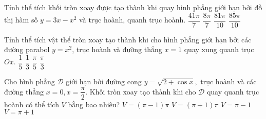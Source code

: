 \begin{ex}%
Tính thể tích khối tròn xoay được tạo thành khi quay hình phẳng giới hạn bởi đồ thị hàm số $y=3x-x^2$ và trục hoành, quanh trục hoành.
\choice
{$\dfrac{41\pi}{7}$}
{$\dfrac{8\pi}{7}$}
{\True $\dfrac{81\pi}{10}$}
{$\dfrac{85\pi}{10}$}
\end{ex}

 
 

 
 


 

\begin{ex}%
Tính thể tích vật thể tròn xoay tạo thành khi cho hình phẳng giới hạn bởi các đường parabol $y=x^2$, trục hoành và đường thẳng $x=1$ quay xung quanh trục $Ox$.
\choice
{$\dfrac{1}{5}$}
{$\dfrac{1}{3}$}
{\True $\dfrac{\pi}{5}$}
{$\dfrac{\pi}{3}$}
\end{ex}

\begin{ex}%
Cho hình phẳng $\mathscr{D}$ giới hạn bởi đường cong $y=\sqrt{2+\cos x},$ trục hoành và các đường thẳng $x=0,x=\dfrac{\pi}{2}$. Khối tròn xoay tạo thành khi cho $\mathscr{D}$ quay quanh trục hoành có thể tích $V$ bằng bao nhiêu?
\choice
{$V=(\pi-1)\pi $}
{\True $V=(\pi+1)\pi $}
{$V=\pi-1$}
{$V=\pi+1$}
\end{ex}

 

